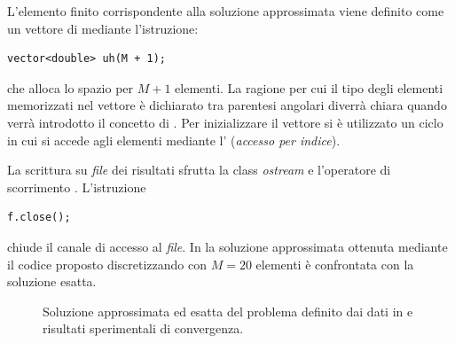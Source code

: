 L'elemento finito corrispondente alla soluzione approssimata viene
definito come un vettore di  mediante l'istruzione:
\lstset{basicstyle=\scriptsize\sf}
\begin{lstlisting}
vector<double> uh(M + 1);
\end{lstlisting}
\lstset{basicstyle=\sf}
che alloca lo spazio per $M+1$ elementi. La ragione per cui il tipo
degli elementi memorizzati nel vettore \`e dichiarato tra parentesi
angolari diverr\`a chiara quando verr\`a introdotto il concetto di
. Per inizializzare il vettore si \`e utilizzato un
ciclo  in cui si accede agli elementi mediante
l' (\emph{accesso per indice}).

La scrittura su \emph{file} dei risultati sfrutta la class
\emph{ostream} e l'operatore di scorrimento \cpp{<<}. L'istruzione
\lstset{basicstyle=\scriptsize\sf}
\begin{lstlisting}
f.close();
\end{lstlisting}
\lstset{basicstyle=\sf}
chiude il canale di accesso al \emph{file}. In
 la soluzione approssimata ottenuta mediante
il codice proposto discretizzando con $M=20$ elementi \`e confrontata
con la soluzione esatta.
%
\begin{figure}
\caption{Soluzione approssimata ed esatta del problema definito dai
dati in  e risultati sperimentali di convergenza.}
\label{fig:fin:results}
\end{figure}
